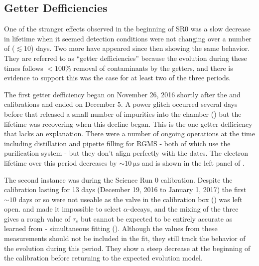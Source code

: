 \subsection{Getter Defficiencies}
\label{subsec:electron_lifetime_model_detector_effects_getter}
One of the stranger effects observed in the beginning of SR0 was a slow decrease in lifetime when it seemed detection conditions were not
changing over a number of ($\lesssim 10$) days.  Two more have appeared since then showing the same behavior.  They are referred to
as ``getter defficiencies'' because the evolution during these times follows $< 100\%$ removal of
contaminants by the getters, and there is evidence to support this was the case for at least two of the three periods.

The first getter defficiency
began on November 26, 2016 shortly after the \ambe and \metakr calibrations and ended on December 5.  A power glitch occurred several
days before that released a small number of impurities into the chamber
() but the lifetime was recovering when this decline
began.  This is the one getter defficiency that lacks an explanation.  There were a number of ongoing operations
at the time including  distillation and pipette filling for RGMS - both of which use the purification system - but they don't
align perfectly with the dates.  The electron lifetime over this period decreases by ${\sim}10\ \mathrm{\mu s}$ and is shown in the left
panel of .

The second instance was during the Science Run 0  calibration.  Despite the calibration lasting for 13 days
(December 19, 2016 to January 1, 2017) the first ${\sim} 10$ days or
so were not useable as the valve in the calibration box () was left
open.   and  made it impossible to select  $\alpha$-decays, and the mixing of the three gives a
rough
value of $\tau_e$ but cannot be expected to be entirely accurate as learned from \rnbkg- simultaneous fitting
().  Although the values from these measurements should not be included in the
fit, they still track the behavior of the evolution during this period.  They show a steep decrease at the beginning of the calibration
before returning to the expected evolution model.


